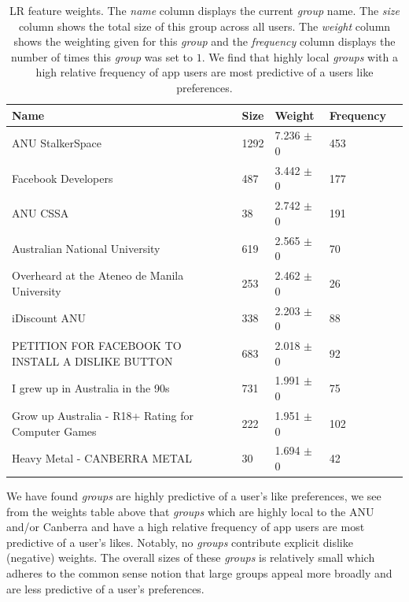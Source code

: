 \begin{table}[h]
\begin{minipage}[b]{1.0\textwidth}
\centering
  \begin{tabular}{|l|l|l|l|l|} %
  \hline
  \textbf{Name} & \textbf{Size} & \textbf{Weight} & \textbf{Frequency} \\ \hline
\small{ANU StalkerSpace} & 1292 & 7.236 $\pm$ 0 & 453 \\ \hline
\small{Facebook Developers} & 487 & 3.442 $\pm$ 0 & 177 \\ \hline
\small{ANU CSSA} & 38 & 2.742 $\pm$ 0 & 191 \\ \hline
\small{Australian National University} & 619 & 2.565 $\pm$ 0 & 70 \\ \hline
\small{Overheard at the Ateneo de Manila University} & 253 & 2.462 $\pm$ 0 & 26 \\ \hline
\small{iDiscount ANU} & 338 & 2.203 $\pm$ 0 & 88 \\ \hline
\small{PETITION FOR FACEBOOK TO INSTALL A DISLIKE BUTTON} & 683 & 2.018 $\pm$ 0 & 92 \\ \hline
\small{I grew up in Australia in the 90s} & 731 & 1.991 $\pm$ 0 & 75 \\ \hline
\small{Grow up Australia - R18+ Rating for Computer Games} & 222 & 1.951 $\pm$ 0 & 102 \\ \hline
\small{Heavy Metal - CANBERRA METAL} & 30 & 1.694 $\pm$ 0 & 42 \\ \hline
  \end{tabular}
  \caption{LR feature weights. The \emph{name} column displays the current \emph{group} name.
  The \emph{size} column shows the total size of this group across all users.
  The \emph{weight} column shows the weighting given for this \emph{group} and the \emph{frequency} column displays the number of times 
  this \emph{group} was set to $1$. We find that highly local \emph{groups} with a high relative frequency of app users are most predictive of a users like preferences.}
\end{minipage}
\end{table}

We have found \emph{groups} are highly predictive of a user's like preferences, we see from the weights table above that \emph{groups} which are highly local to 
the ANU and/or Canberra and have a high relative frequency of app users are most predictive of a user's likes. Notably, no \emph{groups} contribute 
explicit dislike (negative) weights. The 
overall sizes of these \emph{groups} is relatively small which adheres to the common sense notion that large groups appeal more 
broadly and are less predictive of a user's preferences.


